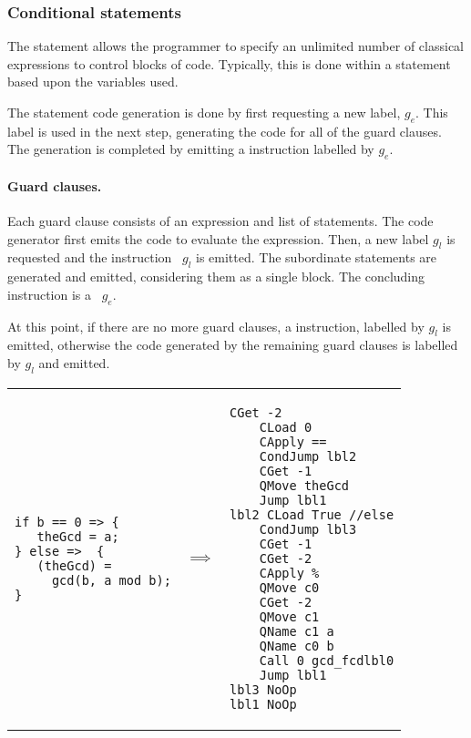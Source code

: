 \subsubsection{Conditional statements}
The  statement allows the programmer to specify an
unlimited number of classical expressions to control blocks of code. Typically,
this is done within a  statement based upon the variables used.

The statement code generation is done by first requesting a new label, $g_e$.
This label is used in the next step,  generating the 
code for all of the guard clauses. The generation is completed by emitting a 
 instruction labelled by $g_e$.

\paragraph{Guard clauses.}\label{para:guardclauses} 
Each guard clause consists of an expression and
list of statements. The code generator first emits
 the code to evaluate the expression. 
Then, a new label $g_l$ is requested and the instruction ~$g_l$
is emitted. The subordinate statements are generated and emitted, 
considering them as a 
single block. The concluding instruction is a ~$g_e$.

At this point, if there are no more guard clauses, a  instruction,
labelled by $g_l$ is emitted, otherwise the code generated by the remaining
guard clauses is labelled by $g_l$ and emitted.

\begin{center}
\begin{tabular}{p{2in}p{.3in}p{2.5in}}
{\begin{singlespace}
\begin{lstlisting}[style=linqpl]
if b == 0 => { 
   theGcd = a;
} else =>  { 
   (theGcd) = 
     gcd(b, a mod b);
}
\end{lstlisting}
\end{singlespace}}
 & { \qquad \qquad \quad \quad \qquad \qquad $\implies$} &
{\begin{singlespace}
\begin{lstlisting}[style=linqpl]
    CGet -2
    CLoad 0
    CApply ==
    CondJump lbl2
    CGet -1
    QMove theGcd
    Jump lbl1
lbl2 CLoad True //else
    CondJump lbl3
    CGet -1
    CGet -2
    CApply %
    QMove c0
    CGet -2
    QMove c1
    QName c1 a
    QName c0 b
    Call 0 gcd_fcdlbl0
    Jump lbl1
lbl3 NoOp
lbl1 NoOp
\end{lstlisting}
\end{singlespace}}
\end{tabular}
\end{center}


